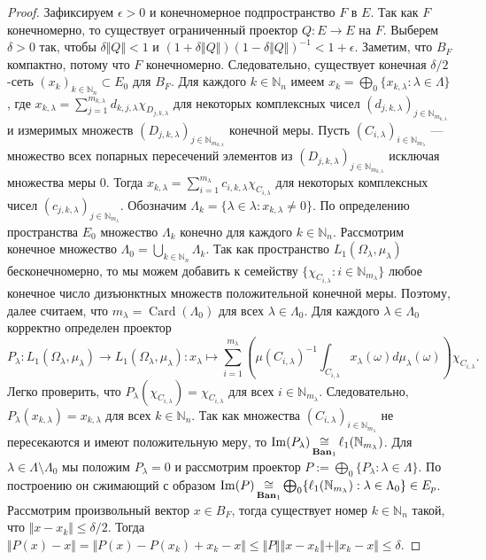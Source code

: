 \begin{proof}
Зафиксируем $\epsilon>0$ и конечномерное подпространство $F$ в $E$. Так как $F$ конечномерно, то существует ограниченный проектор $Q:E\to E$ на $F$. Выберем $\delta>0$ так, чтобы $\delta\Vert Q\Vert<1$ и $(1+\delta\Vert Q\Vert)(1-\delta\Vert Q\Vert)^{-1}<1+\epsilon$. Заметим, что $B_F$ компактно, потому что $F$ конечномерно. Следовательно, существует конечная $\delta/2$-сеть $(x_k)_{k\in\mathbb{N}_n}\subset E_0$ для $B_F$. Для каждого $k\in\mathbb{N}_n$ имеем $x_k=\bigoplus_0\{x_{k,\lambda}:\lambda\in\Lambda\}$, где $x_{k,\lambda}=\sum_{j=1}^{m_{k,\lambda}}d_{k,j,\lambda}\chi_{D_{j,k,\lambda}}$ для некоторых комплексных чисел $(d_{j,k,\lambda})_{j\in\mathbb{N}_{m_{k,\lambda}}}$ и измеримых множеств $(D_{j,k,\lambda})_{j\in\mathbb{N}_{m_{k,\lambda}}}$ конечной меры. Пусть $(C_{i,\lambda})_{i\in\mathbb{N}_{m_\lambda}}$ --- множество всех попарных пересечений элементов из $(D_{j,k,\lambda})_{j\in\mathbb{N}_{m_{k,\lambda}}}$ исключая множества меры $0$. Тогда $x_{k,\lambda}=\sum_{i=1}^{m_\lambda} c_{i,k,\lambda}\chi_{C_{i,\lambda}}$ для некоторых комплексных чисел $(c_{j,k,\lambda})_{j\in\mathbb{N}_{m_{\lambda}}}$. Обозначим $\Lambda_k=\{\lambda\in\lambda:x_{k,\lambda}\neq 0\}$. По определению пространства $E_0$ множество $\Lambda_k$ конечно для каждого $k\in\mathbb{N}_n$. Рассмотрим конечное множество $\Lambda_0=\bigcup_{k\in\mathbb{N}_n}\Lambda_k$. Так как пространство $L_1(\Omega_\lambda, \mu_\lambda)$ бесконечномерно, то мы можем добавить к семейству $\{\chi_{C_{i,\lambda}}:i\in\mathbb{N}_{m_\lambda}\}$ любое конечное число дизъюнктных множеств положительной конечной меры. Поэтому, далее считаем, что $m_\lambda=\operatorname{Card}(\Lambda_0)$ для всех $\lambda\in\Lambda_0$. Для каждого $\lambda\in\Lambda_0$ корректно определен проектор 
$$
P_\lambda:L_1(\Omega_\lambda,\mu_\lambda)\to L_1(\Omega_\lambda,\mu_\lambda):x_\lambda\mapsto \sum_{i=1}^{m_\lambda}\left( \mu(C_{i,\lambda})^{-1}\int_{C_{i,\lambda}}x_\lambda(\omega)d\mu_\lambda(\omega)\right)\chi_{C_{i,\lambda}}.
$$
Легко проверить, что $P_\lambda(\chi_{C_{i,\lambda}})=\chi_{C_{i,\lambda}}$ для всех $i\in\mathbb{N}_{m_\lambda}$. Следовательно, $P_\lambda(x_{k,\lambda})=x_{k,\lambda}$ для всех $k\in\mathbb{N}_n$. Так как множества $(C_{i,\lambda})_{i\in\mathbb{N}_{m_\lambda}}$ не пересекаются и имеют положительную меру, то $\operatorname{Im}(P_\lambda)\mathop{\mathbin{\cong}}\limits_{\mathbf{Ban}_1}\ell_1(\mathbb{N}_{m_\lambda})$. Для $\lambda\in\Lambda\setminus\Lambda_0$ мы положим $P_\lambda=0$ и рассмотрим проектор $P:=\bigoplus_0\{P_\lambda:\lambda\in\Lambda\}$. По построению он сжимающий с образом $\operatorname{Im}(P)\mathop{\mathbin{\cong}}\limits_{\mathbf{Ban}_1}\bigoplus_0\{\ell_1(\mathbb{N}_{m_\lambda}):\lambda\in\Lambda_0\}\in E_{p}$. Рассмотрим произвольный вектор $x\in B_F$, тогда существует номер $k\in\mathbb{N}_n$ такой, что $\Vert x-x_k\Vert\leq \delta/2$. Тогда $\Vert P(x)-x\Vert=\Vert P(x)-P(x_k)+x_k-x\Vert\leq\Vert P\Vert\Vert x-x_k\Vert+\Vert x_k-x\Vert\leq\delta$.


\end{proof}
